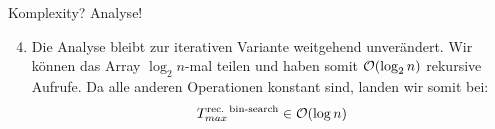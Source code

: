 {\begin{frame}[c]{Komplexity? Analyse!}
\begin{enumerate}[<+(1)->]
    \setcounter{enumi}{3}
    \item {} \pause
    Die Analyse bleibt zur iterativen Variante weitgehend unverändert. \pause Wir können das Array \(\log_2 n\)-mal teilen und haben somit \(\mathcal{O}(\log_2 n)\) rekursive Aufrufe. Da alle anderen Operationen konstant sind, landen wir somit bei: \begin{equation*}
        T_{max}^{\text{rec. bin-search}} \in \mathcal{O}(\log n)
    \end{equation*}
\end{enumerate}
\end{frame}
}


